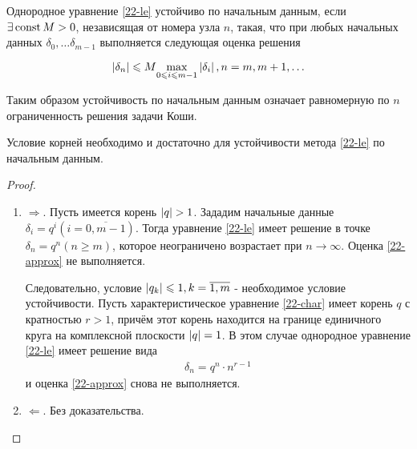 \begin{definition}
  Однородное уравнение \eqref{22-le} устойчиво по начальным данным, если $\exists \operatorname{\text{const}}
  M > 0$, независящая от номера узла $n$, такая, что при любых начальных данных
  $\delta_0, \ldots \delta_{m - 1}$ выполняется следующая оценка решения
\end{definition}
\begin{equation}
  \label{22-approx}
  \left\lvert \delta_n \right\rvert \leqslant M \underset{0 \leqslant i \leqslant m - 1}{\max}\left\lvert \delta_i \right\rvert,
  n = m, m + 1, \ldots
\end{equation}

Таким образом устойчивость по начальным данным означает равномерную по $n$ ограниченность
решения задачи Коши.

\begin{theorem}
  Условие корней необходимо и достаточно для устойчивости метода \eqref{22-le} по
  начальным данным.
\end{theorem}
\begin{proof}
  
  \begin{enumerate}
    \item $\Rightarrow$. Пусть имеется корень $\left\lvert q \right\rvert > 1$. Зададим начальные данные
    $\delta_i = q^i (i = \overline{0, m - 1})$. Тогда уравнение \eqref{22-le} имеет решение
    в точке $\delta_n = q^n(n \geqslant m)$, которое неограничено возрастает при
    $n \to \infty$. Оценка \eqref{22-approx} не выполняется.

    Следовательно, условие $\left\lvert q_k \right\rvert \leqslant 1, k = \overline{1, m}$ - необходимое
    условие устойчивости. Пусть характеристическое уравнение \eqref{22-char} имеет корень
    $q$ с кратностью $r > 1$, причём этот корень находится на границе единичного круга на
    комплексной плоскости $\left\lvert q \right\rvert = 1$. В этом случае однородное уравнение \eqref{22-le}
    имеет решение вида
    \begin{align*}
      \delta_n = q^n\cdot n^{r - 1}
    \end{align*}
    и оценка \eqref{22-approx} снова не выполняется.
    \item $\Leftarrow$. Без доказательства.
  \end{enumerate}
\end{proof}

